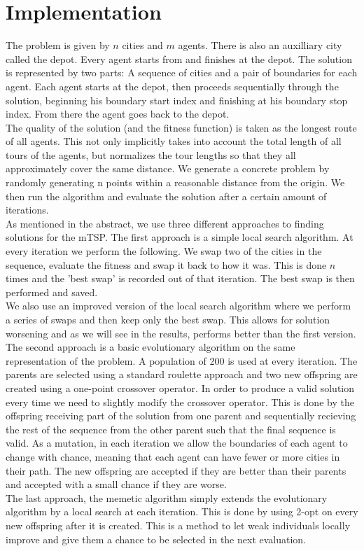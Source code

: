 \documentclass[journal]{IEEEtrancz}
\begin{document}
\section{Implementation}
The problem is given by $n$ cities and $m$ agents. There is also an auxilliary city called the depot. Every agent
starts from and finishes at the depot. The solution is represented by two parts: A sequence of cities and a pair of boundaries for each agent. Each agent starts at the depot, then proceeds sequentially through the solution, beginning his boundary start index and finishing at his boundary stop index. From there the agent goes back to the depot. \\
The quality of the solution (and the fitness function) is taken as the longest route of all agents. This not only implicitly takes into account the total length of all tours of the agents, but normalizes the tour lengths so that they all approximately cover the same distance. We generate a concrete problem by randomly generating n points within a reasonable distance from the origin. We then run the algorithm and evaluate the solution after a certain amount of iterations. \\
As mentioned in the abstract, we use three different approaches to finding solutions for the mTSP.
The first approach is a simple local search algorithm. At every iteration we perform the following. We swap two of the cities in the sequence, evaluate the fitness and swap it back to how it was. This is done $n$ times
and the 'best swap' is recorded out of that iteration. The best swap is then performed and saved. \\
We also use an improved version of the local search algorithm where we perform a series of swaps and then keep only the best swap. This allows for solution worsening and as we will see in the results, performs better than the first version.
The second approach is a basic evolutionary algorithm on the same representation of the problem. 
A population of 200 is used at every iteration. The parents are selected using a standard roulette approach
and two new offspring are created using a one-point crossover operator. In order to produce a valid solution
every time we need to slightly modify the crossover operator. This is done by the offspring receiving part of the solution from one parent and sequentially recieving the rest of the sequence from the other parent such that the final sequence is valid. As a mutation, in each iteration we allow the boundaries of each agent to change with chance, meaning that each agent can have fewer or more cities in their path. The new offspring are accepted if they are better than their parents and accepted with a small chance if they are worse. \\
The last approach, the memetic algorithm simply extends the evolutionary algorithm by a local search at each iteration. This is done by using 2-opt on every new offspring after it is created. This is a method to let weak individuals locally improve and give them a chance to be selected in the next evaluation.
\end{document}
